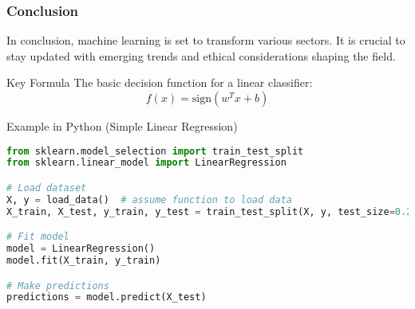 \documentclass[aspectratio=169]{beamer}
\begin{document}
\begin{frame}[fragile]
    \frametitle{Conclusion}
    In conclusion, machine learning is set to transform various sectors. It is crucial to stay updated with emerging trends and ethical considerations shaping the field.

    \begin{block}{Key Formula}
        The basic decision function for a linear classifier:
        \begin{equation*}
            f(x) = \text{sign}(w^T x + b)
        \end{equation*}
    \end{block}

    \begin{block}{Example in Python (Simple Linear Regression)}
    \begin{lstlisting}[language=Python]
from sklearn.model_selection import train_test_split
from sklearn.linear_model import LinearRegression

# Load dataset
X, y = load_data()  # assume function to load data
X_train, X_test, y_train, y_test = train_test_split(X, y, test_size=0.2)

# Fit model
model = LinearRegression()
model.fit(X_train, y_train)

# Make predictions
predictions = model.predict(X_test)
    \end{lstlisting}
    \end{block}
\end{frame}
\end{document}

